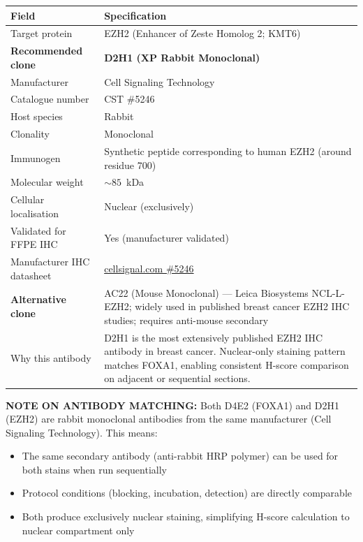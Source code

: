 \documentclass[11pt, a4paper]{article}
\begin{document}
\begin{center}
\begin{tabular}{p{4.5cm}p{9cm}}
\toprule
\textbf{Field} & \textbf{Specification} \\
\midrule
Target protein & EZH2 (Enhancer of Zeste
    Homolog 2; KMT6) \\[0.3em]
\textbf{Recommended clone} &
    \textbf{D2H1 (XP Rabbit Monoclonal)} \\[0.3em]
Manufacturer & Cell Signaling Technology \\[0.3em]
Catalogue number & CST \#5246 \\[0.3em]
Host species & Rabbit \\[0.3em]
Clonality & Monoclonal \\[0.3em]
Immunogen & Synthetic peptide corresponding
    to human EZH2 (around residue 700) \\[0.3em]
Molecular weight & ${\sim}85$~kDa \\[0.3em]
Cellular localisation & Nuclear (exclusively) \\[0.3em]
Validated for FFPE IHC & Yes (manufacturer
    validated) \\[0.3em]
Manufacturer IHC datasheet &
    \href{https://www.cellsignal.com/products/primary-antibodies/ezh2-d2h1-xp-rabbit-mab/5246}
    {cellsignal.com \#5246} \\[0.3em]
\textbf{Alternative clone} &
    AC22 (Mouse Monoclonal) ---
    Leica Biosystems NCL-L-EZH2;
    widely used in published breast
    cancer EZH2 IHC studies;
    requires anti-mouse secondary \\[0.3em]
Why this antibody & D2H1 is the most
    extensively published EZH2 IHC
    antibody in breast cancer.
    Nuclear-only staining pattern matches
    FOXA1, enabling consistent
    H-score comparison on adjacent
    or sequential sections. \\
\bottomrule
\end{tabular}
\end{center}

\begin{mdframed}[backgroundcolor=protocolbox,
                 linecolor=green!50!black,
                 linewidth=1pt]
\textbf{NOTE ON ANTIBODY MATCHING:}
Both D4E2 (FOXA1) and D2H1 (EZH2) are rabbit
monoclonal antibodies from the same manufacturer
(Cell Signaling Technology). This means:
\begin{itemize}[noitemsep]
    \item The same secondary antibody (anti-rabbit
    HRP polymer) can be used for both stains
    when run sequentially
    \item Protocol conditions (blocking, incubation,
    detection) are directly comparable
    \item Both produce exclusively nuclear staining,
    simplifying H-score calculation to nuclear
    compartment only
\end{itemize}
\end{mdframed}
\end{document}
